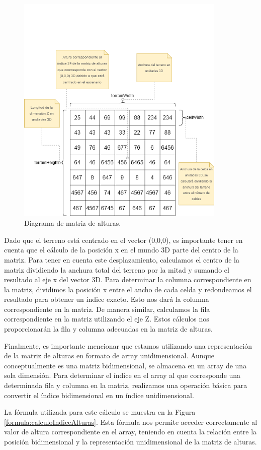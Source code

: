 \documentclass[a4paper, 11pt]{book}
\begin{document}
\begin{figure}[h]
  \centering
  \includegraphics[width=10cm, keepaspectratio]{img/terrain.drawio.png}
  \caption{Diagrama de matriz de alturas.}
  \label{fig:terrainDrawio}
\end{figure}
Dado que el terreno está centrado en el vector (0,0,0), es importante tener en cuenta que el cálculo de la posición x en el mundo 3D parte del centro de la matriz. Para tener en cuenta este desplazamiento, calculamos el centro de la matriz dividiendo la anchura total del terreno por la mitad y sumando el resultado al eje x del vector 3D. Para determinar la columna correspondiente en la matriz, dividimos la posición x entre el ancho de cada celda y redondeamos el resultado para obtener un índice exacto. Esto nos dará la columna correspondiente en la matriz. 
De manera similar, calculamos la fila correspondiente en la matriz utilizando el eje Z. Estos cálculos nos proporcionarán la fila y columna adecuadas en la matriz de alturas.

Finalmente, es importante mencionar que estamos utilizando una representación de la matriz de alturas en formato de array unidimensional. Aunque conceptualmente es una matriz bidimensional, se almacena en un array de una sola dimensión. Para determinar el índice en el array al que corresponde una determinada fila y columna en la matriz, realizamos una operación básica para convertir el índice bidimensional en un índice unidimensional.

La fórmula utilizada para este cálculo se muestra en la Figura \ref{formula:calculoIndiceAlturas}. Esta fórmula nos permite acceder correctamente al valor de altura correspondiente en el array, teniendo en cuenta la relación entre la posición bidimensional y la representación unidimensional de la matriz de alturas.
\end{document}
